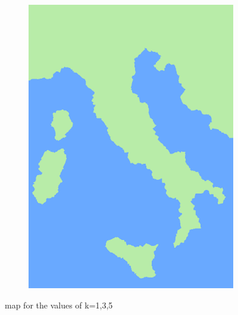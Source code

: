 \documentclass{beamer}
\begin{document}
\begin{frame}
\begin{figure}
\begin{subfigure}[b]{0.3\textwidth}
     \end{subfigure}
     \hfill
     \begin{subfigure}[b]{0.3\textwidth}
         \centering
         \includegraphics[width=\textwidth]{italy4.png}
         
     \end{subfigure}
        \caption{map for the values of k=1,3,5}
        \label{fig:three graphs}
\end{figure}

 \end{frame}
\end{document}
